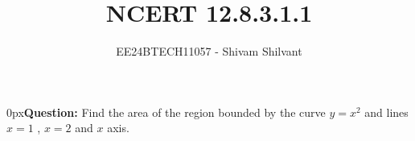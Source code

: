 \documentclass[journal]{IEEEtran}
\begin{document}

\vspace{3cm}

\title{NCERT 12.8.3.1.1}
\author{EE24BTECH11057 - Shivam Shilvant}
{\let\newpage\relax\maketitle}

\renewcommand{\thefigure}{\theenumi}
\renewcommand{\thetable}{\theenumi}
\setlength{\intextsep}{10pt} %

\parindent 0px\textbf{Question:} Find the area of the region bounded by the curve $y=x^2$ and lines $x=1$ , $x=2$ and $x$ axis.
\end{document}
